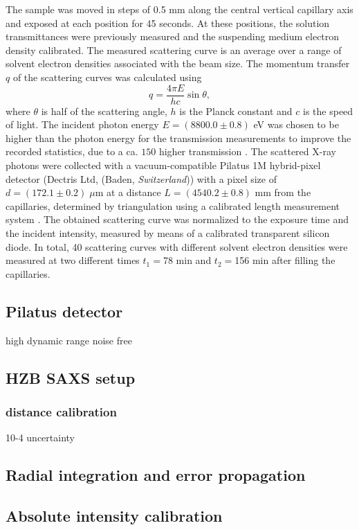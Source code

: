 The sample was moved in steps of 0.5 mm along the central vertical capillary axis and exposed at each position for 45 seconds. At these positions, the solution transmittances were previously measured and the suspending medium electron density calibrated. The measured scattering curve is an average over a range of solvent electron densities associated with the beam size. The momentum transfer \(q\) of the scattering curves was calculated using
\begin{equation}
q=\frac{4\pi E}{hc}\sin\theta ,
\end{equation}
where \(\theta\) is half of the scattering angle, \(h\) is the Planck constant and \(c\) is the speed of light. The incident photon energy \(E = \left(8800.0  \pm 0.8\right)\) eV was chosen to be higher than the photon energy for the transmission measurements to improve the recorded statistics, due to a ca. \(150\) higher transmission \cite{henke_x-ray_1993}. The scattered X-ray photons were collected with a vacuum-compatible Pilatus 1M hybrid-pixel detector (Dectris Ltd, (Baden, \emph{Switzerland})) with a pixel size of \(d = \left(172.1  \pm 0.2\right) \; \mu \)m at a distance \(L = \left(4540.2  \pm 0.8\right)\) mm from the capillaries, determined by triangulation using a calibrated length measurement system \cite{wernecke_characterization_2014}. The obtained scattering curve was normalized to the exposure time and the incident intensity, measured by means of a calibrated transparent silicon diode.  In total, 40 scattering curves with different solvent electron densities were measured at two different times \(t_1=\)78 min and \(t_2=\)156 min after filling the capillaries.
\subsection{Pilatus detector}
high dynamic range
noise free
\subsection{HZB SAXS setup}
\subsubsection{distance calibration}
10-4 uncertainty

\subsection{Radial integration and error propagation}
\subsection{Absolute intensity calibration}
